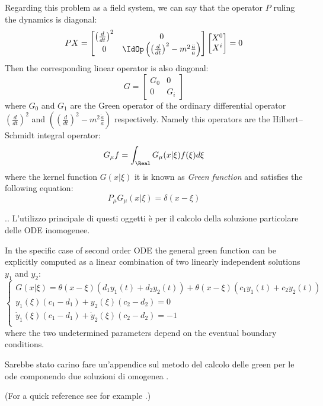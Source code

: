 \documentclass[Main]{subfiles}
\begin{document}
			Regarding this problem as a field system, we can say that the operator $P$ ruling the dynamics is diagonal:
			\begin{displaymath}
				P X =
				 \begin{bmatrix}  
				 \left(\frac{d}{dt}\right)^2 & 0 \\
				 0 & \IdOp \left( \left(\frac{d}{dt}\right)^2 - m^2 \frac{\ddot{a}}{a} \right)
				 \end{bmatrix}
				 \begin{bmatrix} X^0 \\ X^i  \end{bmatrix}
				 = 0
			\end{displaymath}
			Then the corresponding linear operator is also diagonal:
			\begin{displaymath}
				G =
				 \begin{bmatrix}  
				 G_0 & 0 \\
				 0 & G_i
				 \end{bmatrix}
			\end{displaymath}		
			where $G_0$ and $G_1$ are the Green operator of the ordinary differential operator $\left(\frac{d}{dt}\right)^2$ and $\left( \left(\frac{d}{dt}\right)^2 - m^2 \frac{\ddot{a}}{a} \right)$ respectively.
			Namely this operators are the Hilbert–Schmidt integral operator:
			\begin{displaymath}
				G_\mu f = \int_\Real G_\mu( x \vert \xi ) f(\xi) d\xi
			\end{displaymath}
			where the kernel function $G( x \vert \xi ) $ it is known as \emph{Green function} and satisfies the following equation:
			\begin{displaymath}
				P_\mu G_\mu( x | \xi) = \delta( x - \xi)
			\end{displaymath}
\ifToninus
	\begin{remark}
		\danger .. L'utilizzo principale di questi oggetti è per il calcolo della soluzione particolare delle ODE inomogenee.
	\end{remark}
\fi			
			In the specific case of second order ODE the general green function can be explicitly computed as a linear combination of two linearly independent solutions $y_1$ and $y_2$:
			\begin{equation}
			\begin{cases}
                        G( x \vert \xi) = \theta( x - \xi) \left(d_1 y_1(t) + d_2 y_2(t) \right) + \theta( x - \xi) \left(c_1 y_1(t) + c_2 y_2(t) \right) \\
						y_1(\xi) (c_1-d_1) + y_2(\xi) ( c_2 - d_2) = 0 \\
						\dot{y}_1(\xi) (c_1-d_1) + \dot{y}_2(\xi) ( c_2 - d_2) = -1 \\
            \end{cases}
			\end{equation}
			where the two undetermined parameters depend on the eventual boundary conditions.
\ifToninus
	\begin{Warning}
		Sarebbe stato carino fare un'appendice sul metodo del calcolo delle green per le ode componendo due soluzioni di omogenea \cite{Tornberg}.
	\end{Warning}
\fi		
			(For a quick reference see for example \cite{Tornberg}.)
			
\end{document}
